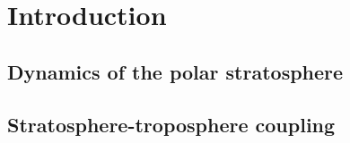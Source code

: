 \chapter{Introduction}

\section{Dynamics of the polar stratosphere}


\section{Stratosphere-troposphere coupling}


